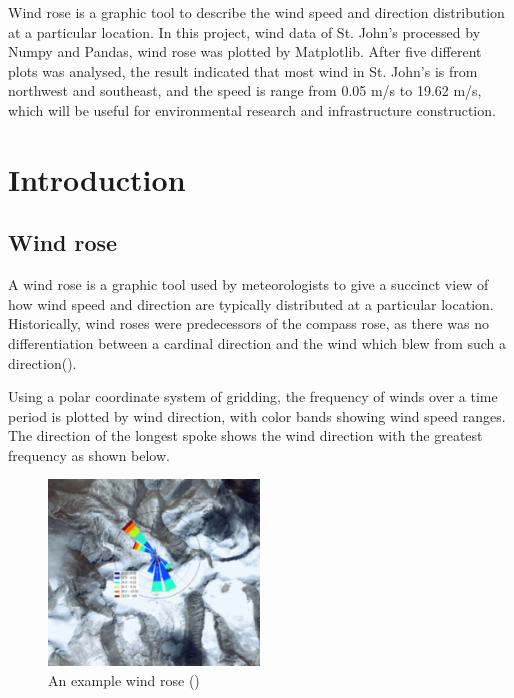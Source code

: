 \documentclass[10pt]{report}
\begin{document}
Wind rose is a graphic tool to describe the wind speed and direction distribution at a particular location. In this project, wind data of St. John's processed by Numpy and Pandas, wind rose was plotted by Matplotlib. After five different plots was analysed, the result indicated that most wind in St. John's is from northwest and southeast, and the speed is range from 0.05 m/s to 19.62 m/s, which will be useful for environmental research and infrastructure construction.


\singlespacing          %
\listoffigures          %


 \tableofcontents


 \chapter{Introduction}     %
 
 \section{Wind rose}

A wind rose is a graphic tool used by meteorologists to give a succinct view of how wind speed and direction are typically distributed at a particular location. Historically, wind roses were predecessors of the compass rose, as there was no differentiation between a cardinal direction and the wind which blew from such a direction(\cite{wikipedia}). \par Using a polar coordinate system of gridding, the frequency of winds over a time period is plotted by wind direction, with color bands showing wind speed ranges. The direction of the longest spoke shows the wind direction with the greatest frequency as shown below. \par

\begin{figure}[h!]
    \centering
    \includegraphics[width=0.50\textwidth]{images/example.png}
    \caption{An example wind rose (\cite{Roubeyrie2018})}
    \label{fig: PaleBlueDot}
\end{figure}
\end{document}
